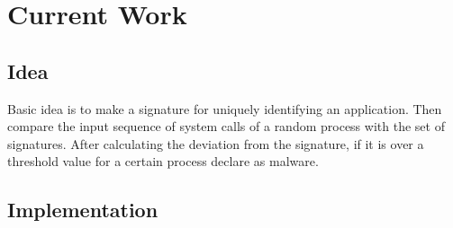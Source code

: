 \section{Current Work}

\subsection{Idea}
Basic idea is to make a signature for uniquely identifying an application. Then compare the input sequence of system calls of a random process with the set of signatures. After calculating the deviation from the signature, if it is over a threshold value for a certain process declare as malware.

\subsection{Implementation}
